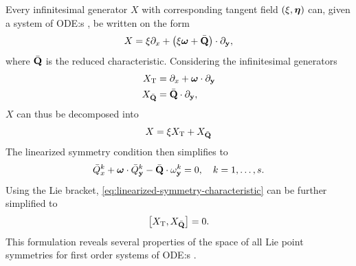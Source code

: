 Every infinitesimal generator \(X\) with corresponding tangent field \((\xi, \vb*{\eta})\) can, given a system of ODE:s , be written on the form
\begin{equation}
  X = \xi \partial_x + \left(\xi \vb*{\omega} + \bar{\vb{Q}}\right) \cdot \partial_{\vb{y}},
\end{equation}
where \(\bar{\vb{Q}}\) is the reduced characteristic.
Considering the infinitesimal generators
\begin{subequations}
  \begin{align}
    X_{\text{T}} &= \partial_x + \vb*{\omega} \cdot \partial_{\vb{y}} \label{eq:trivial-generator-base}\\
    X_{\bar{\vb{Q}}} &= \bar{\vb{Q}} \cdot \partial_{\vb{y}},
  \end{align}
\end{subequations}
\(X\) can thus be decomposed into
\begin{equation} \label{eq:inf-gen-decomposition}
  X = \xi X_{\text{T}} + X_{\bar{\vb{Q}}}
\end{equation}
The linearized symmetry condition  then simplifies to
\begin{equation} \label{eq:linearized-symmetry-characteristic}
  \bar{Q}_x^k + \vb*{\omega} \cdot \bar{Q}_{\vb{y}}^k - \bar{\vb{Q}} \cdot \omega_{\vb{y}}^k = 0 \qc k = 1, \dots, s.
\end{equation}
Using the Lie bracket, \cref{eq:linearized-symmetry-characteristic} can be further simplified to
\begin{equation} \label{eq:linearized-symmetry-bracket}
  \comm{X_{\text{T}}}{X_{\bar{\vb{Q}}}} = 0.
\end{equation}
This formulation reveals several properties of the space of all Lie point symmetries for first order systems of ODE:s .

